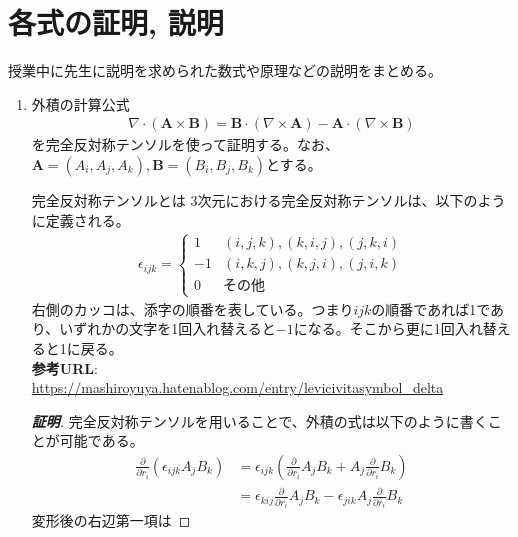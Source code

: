 \documentclass[a4paper,11pt,dvipdfmx]{jsarticle}
\begin{document}
\section*{各式の証明, 説明}
授業中に先生に説明を求められた数式や原理などの説明をまとめる。
\begin{enumerate}
  \item 外積の計算公式
  \begin{align*}
    \nabla \cdot (\mathbf{A} \times \mathbf{B}) = \mathbf{B} \cdot (\nabla \times \mathbf{A}) - \mathbf{A} \cdot (\nabla \times \mathbf{B})
  \end{align*}
  を完全反対称テンソルを使って証明する。なお、$\mathbf{A} = (A_i, A_j, A_k), \mathbf{B} = (B_i, B_j, B_k)$とする。
  \begin{itembox}[l]{完全反対称テンソルとは}
    3次元における完全反対称テンソルは、以下のように定義される。
    \begin{align*}
      \epsilon_{ijk} = 
      \begin{cases}
        1 &  (i, j, k), (k, i, j), (j, k, i) \\
        -1 &  (i, k, j), (k, j, i), (j, i, k) \\
        0 & その他
      \end{cases}
    \end{align*}
    右側のカッコは、添字の順番を表している。つまり$ijk$の順番であれば1であり、いずれかの文字を1回入れ替えると$-1$になる。そこから更に1回入れ替えると1に戻る。
    \\
    \textbf{参考URL}: \url{https://mashiroyuya.hatenablog.com/entry/levicivitasymbol_delta}
  \end{itembox}
  \begin{proof}[\textbf{証明}]
    完全反対称テンソルを用いることで、外積の式は以下のように書くことが可能である。
    \begin{align*}
      \frac{\partial}{\partial r_i}\left( \epsilon_{ijk} A_j B_k \right) &= \epsilon_{ijk}\left( \frac{\partial}{\partial r_i} A_j B_k + A_j \frac{\partial}{\partial r_i} B_k \right) 
      \\
      &= \epsilon_{kij}\frac{\partial}{\partial r_i}A_j B_k - \epsilon_{jik}A_j \frac{\partial}{\partial r_i}B_k
    \end{align*}
    変形後の右辺第一項は
  \end{proof}
  

\end{enumerate}
\end{document}

